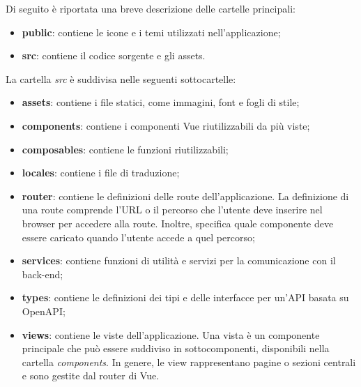 \vspace{0.5\baselineskip}
\par Di seguito è riportata una breve descrizione delle cartelle principali:
\begin{itemize}
  \item \textbf{public}: contiene le icone e i temi utilizzati nell'applicazione;
  \item \textbf{src}: contiene il codice sorgente e gli assets.
\end{itemize}

\vspace{0.5\baselineskip}
\par La cartella \textit{src} è suddivisa nelle seguenti sottocartelle:
\begin{itemize}
  \item \textbf{assets}: contiene i file statici, come immagini, font e fogli di stile;
  \item \textbf{components}: contiene i componenti Vue riutilizzabili da più viste;
  \item \textbf{composables}: contiene le funzioni riutilizzabili;
  \item \textbf{locales}: contiene i file  di traduzione;
  \item \textbf{router}: contiene le definizioni delle route dell'applicazione. La definizione di una route comprende l'URL o il percorso che l'utente deve inserire nel browser per accedere alla route. Inoltre, specifica quale componente deve essere caricato quando l'utente accede a quel percorso;
  \item \textbf{services}: contiene funzioni di utilità e servizi per la comunicazione con il back-end;
  \item \textbf{types}: contiene le definizioni dei tipi e delle interfacce per un'API basata su OpenAPI;
  \item \textbf{views}: contiene le viste dell'applicazione. Una vista è un componente principale che può essere suddiviso in sottocomponenti, disponibili nella cartella \textit{components}. In genere, le view rappresentano pagine o sezioni centrali e sono gestite dal router di Vue.
\end{itemize}
